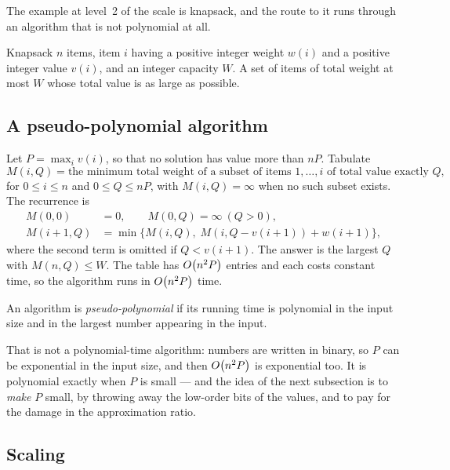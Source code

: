 The example at level~2 of the scale is knapsack, and the route to it runs
through an algorithm that is not polynomial at all.

\begin{probdef}{Knapsack}
  \instance $n$ items, item $i$ having a positive integer weight $w(i)$ and a
  positive integer value $v(i)$, and an integer capacity $W$.
  \question A set of items of total weight at most $W$ whose total value is as
  large as possible.
\end{probdef}

\subsection{A pseudo-polynomial algorithm}

Let $P = \max_i v(i)$, so that no solution has value more than $nP$. Tabulate
\[ M(i,Q) = \text{the minimum total weight of a subset of items } 1,\dots,i
   \text{ of total value exactly } Q, \]
for $0 \le i \le n$ and $0 \le Q \le nP$, with $M(i,Q) = \infty$ when no such
subset exists. The recurrence is
\[ \begin{aligned}
     M(0,0) &= 0, \qquad M(0,Q) = \infty \ (Q > 0), \\
     M(i+1,Q) &= \min\bigl\{ M(i,Q),\; M(i,Q-v(i+1)) + w(i+1) \bigr\},
   \end{aligned} \]
where the second term is omitted if $Q < v(i+1)$. The answer is the largest $Q$
with $M(n,Q) \le W$. The table has $O\!\left(n^2 P\right)$ entries and each costs
constant time, so the algorithm runs in $O\!\left(n^2 P\right)$ time.

\begin{definition}\label{def:pseudo-polynomial}
An algorithm is \emph{pseudo-polynomial} if its running time is polynomial in
the input size and in the largest number appearing in the input.
\end{definition}

That is not a polynomial-time algorithm: numbers are written in binary, so $P$
can be exponential in the input size, and then $O\!\left(n^2P\right)$ is exponential
too. It is polynomial exactly when $P$ is small --- and the idea of the next
subsection is to \emph{make} $P$ small, by throwing away the low-order bits of
the values, and to pay for the damage in the approximation ratio.

\subsection{Scaling}

